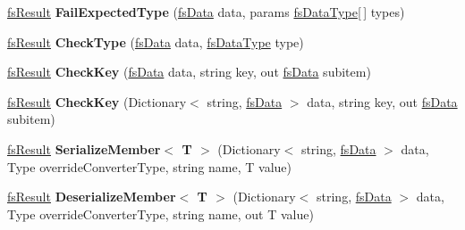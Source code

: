 \begin{DoxyCompactItemize}
\item 
\mbox{\label{class_full_serializer_1_1fs_base_converter_a764855bf8818b5ff93077ea0a9e944b0}} 
\hyperlink{struct_full_serializer_1_1fs_result}{fs\+Result} {\bfseries Fail\+Expected\+Type} (\hyperlink{class_full_serializer_1_1fs_data}{fs\+Data} data, params \hyperlink{namespace_full_serializer_a6eee33d63b94e40fdfcfc59af9fcfc82}{fs\+Data\+Type}\mbox{[}$\,$\mbox{]} types)
\item 
\mbox{\label{class_full_serializer_1_1fs_base_converter_a2dbb1442ec90c3100b09308b9c53aab9}} 
\hyperlink{struct_full_serializer_1_1fs_result}{fs\+Result} {\bfseries Check\+Type} (\hyperlink{class_full_serializer_1_1fs_data}{fs\+Data} data, \hyperlink{namespace_full_serializer_a6eee33d63b94e40fdfcfc59af9fcfc82}{fs\+Data\+Type} type)
\item 
\mbox{\label{class_full_serializer_1_1fs_base_converter_ab42a513c517a3ed26ea228bb33aedd47}} 
\hyperlink{struct_full_serializer_1_1fs_result}{fs\+Result} {\bfseries Check\+Key} (\hyperlink{class_full_serializer_1_1fs_data}{fs\+Data} data, string key, out \hyperlink{class_full_serializer_1_1fs_data}{fs\+Data} subitem)
\item 
\mbox{\label{class_full_serializer_1_1fs_base_converter_a92ebde736d45f36473691936e6cd0147}} 
\hyperlink{struct_full_serializer_1_1fs_result}{fs\+Result} {\bfseries Check\+Key} (Dictionary$<$ string, \hyperlink{class_full_serializer_1_1fs_data}{fs\+Data} $>$ data, string key, out \hyperlink{class_full_serializer_1_1fs_data}{fs\+Data} subitem)
\item 
\mbox{\label{class_full_serializer_1_1fs_base_converter_a024019330f070b9fb3d49a5213c9aae8}} 
\hyperlink{struct_full_serializer_1_1fs_result}{fs\+Result} {\bfseries Serialize\+Member$<$ T $>$} (Dictionary$<$ string, \hyperlink{class_full_serializer_1_1fs_data}{fs\+Data} $>$ data, Type override\+Converter\+Type, string name, T value)
\item 
\mbox{\label{class_full_serializer_1_1fs_base_converter_a6df76d1eac0b4a6577845b4c9ddaa79d}} 
\hyperlink{struct_full_serializer_1_1fs_result}{fs\+Result} {\bfseries Deserialize\+Member$<$ T $>$} (Dictionary$<$ string, \hyperlink{class_full_serializer_1_1fs_data}{fs\+Data} $>$ data, Type override\+Converter\+Type, string name, out T value)
\end{DoxyCompactItemize}


